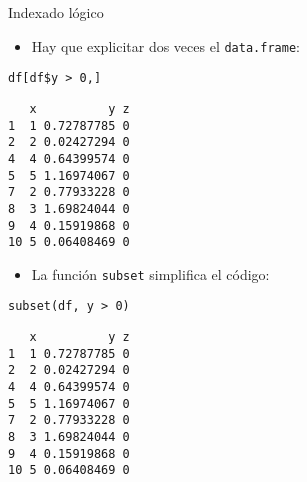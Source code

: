 \documentclass[xcolor={usenames,svgnames,dvipsnames}]{beamer}
\begin{document}
\begin{frame}[fragile,label={sec:orga5c1fef}]{Indexado lógico}
 \begin{itemize}
\item Hay que explicitar dos veces el \texttt{data.frame}:
\end{itemize}
\lstset{language=r,label= ,caption= ,captionpos=b,numbers=none}
\begin{lstlisting}
df[df$y > 0,]
\end{lstlisting}

\begin{verbatim}
   x          y z
1  1 0.72787785 0
2  2 0.02427294 0
4  4 0.64399574 0
5  5 1.16974067 0
7  2 0.77933228 0
8  3 1.69824044 0
9  4 0.15919868 0
10 5 0.06408469 0
\end{verbatim}

\begin{itemize}
\item La función \texttt{subset} simplifica el código:
\end{itemize}
\lstset{language=r,label= ,caption= ,captionpos=b,numbers=none}
\begin{lstlisting}
subset(df, y > 0)
\end{lstlisting}

\begin{verbatim}
   x          y z
1  1 0.72787785 0
2  2 0.02427294 0
4  4 0.64399574 0
5  5 1.16974067 0
7  2 0.77933228 0
8  3 1.69824044 0
9  4 0.15919868 0
10 5 0.06408469 0
\end{verbatim}
\end{frame}
\end{document}
